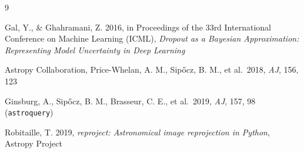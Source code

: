 \documentclass[12pt]{article}
\begin{document}
\begin{thebibliography}{9}

Gal, Y., \& Ghahramani, Z. 2016, in Proceedings of the 33rd International
Conference on Machine Learning (ICML), \textit{Dropout as a Bayesian
Approximation: Representing Model Uncertainty in Deep Learning}

Astropy Collaboration, Price-Whelan, A. M., Sip\H{o}cz, B. M., et al.\ 2018,
\textit{AJ}, 156, 123

Ginsburg, A., Sip\H{o}cz, B. M., Brasseur, C. E., et al.\ 2019,
\textit{AJ}, 157, 98 (\texttt{astroquery})

Robitaille, T. 2019, \textit{reproject: Astronomical image reprojection in
Python}, Astropy Project

\end{thebibliography}
\end{document}
